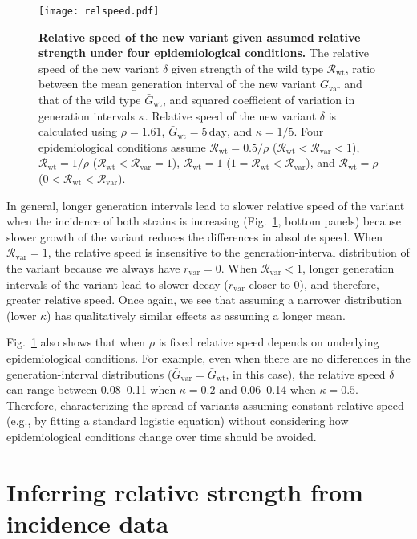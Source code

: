 \documentclass[12pt]{article}
\newcommand{\fref}[1]{Fig.~\ref{fig:#1}}
\newcommand{\vvvar}{\mathrm{var}}
\newcommand{\wwwt}{\mathrm{wt}}
\newcommand{\rx}[1]{\ensuremath{{r}_{#1}}\xspace}
\newcommand{\rv}{\rx{\vvvar}}
\newcommand{\Rx}[1]{\ensuremath{{\mathcal R}_{#1}}\xspace}
\newcommand{\Rw}{\Rx{\wwwt}}
\newcommand{\Rv}{\Rx{\vvvar}}
\newcommand{\days}{\ensuremath{\, \textrm{day}}}
\newcommand{\Gx}[1]{\ensuremath{{\bar G}_{#1}}\xspace}
\newcommand{\Gw}{\Gx{\wwwt}}
\newcommand{\Gv}{\Gx{\vvvar}}
\begin{document}
\begin{figure}[!th]
\texttt{[image: relspeed.pdf]}
\caption{
\textbf{Relative speed of the new variant given assumed relative strength under four epidemiological conditions.}
The relative speed of the new variant $\delta$ given strength of the wild type $\Rw$, ratio between the mean generation interval of the new variant $\Gv$ and that of the wild type $\Gw$, and squared coefficient of variation in generation intervals $\kappa$.
Relative speed of the new variant $\delta$ is calculated using $\rho=1.61$, $\Gw = 5\days$, and $\kappa = 1/5$.
Four epidemiological conditions assume $\Rw=0.5/\rho$ ($\Rw < \Rv < 1$), $\Rw=1/\rho$ ($\Rw < \Rv = 1$), $\Rw=1$ ($1 = \Rw < \Rv$), and $\Rw=\rho$ ($0 < \Rw < \Rv$).
}
\label{fig:relspeed}
\end{figure}

In general, longer generation intervals lead to slower relative speed of the variant when the incidence of both strains is increasing (\fref{relspeed}, bottom panels) because slower growth of the variant reduces the differences in absolute speed.
When $\Rv=1$, the relative speed is insensitive to the generation-interval distribution of the variant because we always have $\rv=0$.
When $\Rv<1$, longer generation intervals of the variant lead to slower decay ($\rv$ closer to 0), and therefore, greater relative speed.
Once again, we see that assuming a narrower distribution (lower $\kappa$) has qualitatively similar effects as assuming a longer mean.

\fref{relspeed} also shows that when $\rho$ is fixed relative speed depends on underlying epidemiological conditions. 
For example, even when there are no differences in the generation-interval distributions ($\Gv=\Gw$, in this case), the relative speed $\delta$ can range between 0.08--0.11 when $\kappa=0.2$ and 0.06--0.14 when $\kappa=0.5$.
Therefore, characterizing the spread of variants assuming constant relative speed (e.g., by fitting a standard logistic equation) without considering how epidemiological conditions change over time should be avoided.

\section{Inferring relative strength from incidence data}
\end{document}
